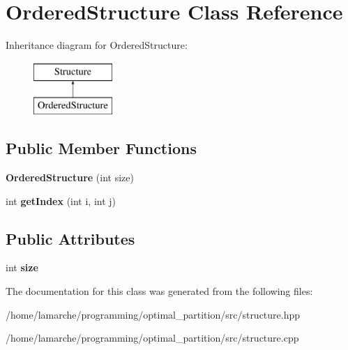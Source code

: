 \hypertarget{classOrderedStructure}{\section{Ordered\-Structure Class Reference}
\label{classOrderedStructure}
}
Inheritance diagram for Ordered\-Structure\-:\begin{figure}[H]
\begin{center}
\leavevmode
\includegraphics[height=2.000000cm]{classOrderedStructure}
\end{center}
\end{figure}
\subsection*{Public Member Functions}
\begin{DoxyCompactItemize}
\item 
\hypertarget{classOrderedStructure_a19e7ae039ef4d446da2bbdde91c21cfb}{{\bfseries Ordered\-Structure} (int size)}\label{classOrderedStructure_a19e7ae039ef4d446da2bbdde91c21cfb}

\item 
\hypertarget{classOrderedStructure_a1a07c725bb6bbea25dc4b529a68bfb5c}{int {\bfseries get\-Index} (int i, int j)}\label{classOrderedStructure_a1a07c725bb6bbea25dc4b529a68bfb5c}

\end{DoxyCompactItemize}
\subsection*{Public Attributes}
\begin{DoxyCompactItemize}
\item 
\hypertarget{classOrderedStructure_ab242085ce98312c82da735eabd9eaa22}{int {\bfseries size}}\label{classOrderedStructure_ab242085ce98312c82da735eabd9eaa22}

\end{DoxyCompactItemize}


The documentation for this class was generated from the following files\-:\begin{DoxyCompactItemize}
\item 
/home/lamarche/programming/optimal\-\_\-partition/src/structure.\-hpp\item 
/home/lamarche/programming/optimal\-\_\-partition/src/structure.\-cpp\end{DoxyCompactItemize}

